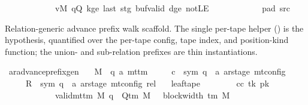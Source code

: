 \begin{isabellebody}
\ \ \ \ \ \ \ \ \ \ \ \ vM\ qQ\ kge{}\ last\ stg\ buf{\isacharunderscore}{\kern0pt}valid\ dge{}\ notLE\isanewline
\ \ \ \ \ \ \ \ \ \ \ \ pad{}\ src{}{\isacharbrackright}{\kern0pt}{\isacharparenright}{\kern0pt}%
\endisatagproof
{\isafoldproof}%
%
\isadelimproof
%
\endisadelimproof
%
\begin{isamarkuptext}%
Relation-generic advance prefix walk scaffold.  The single
  per-tape helper () is the 
  hypothesis, quantified over the per-tape config, tape index, and
  position-kind function; the union- and sub-relation prefixes are
  thin instantiations.%
\end{isamarkuptext}\isamarkuptrue%
\isamarkupfalse%
\ ar{\isacharunderscore}{\kern0pt}advance{\isacharunderscore}{\kern0pt}prefix{\isacharunderscore}{\kern0pt}gen{\isacharcolon}{\kern0pt}\isanewline
\ \ \ M\ {\isacharcolon}{\kern0pt}{\isacharcolon}{\kern0pt}\ {\isachardoublequoteopen}{\isacharparenleft}{\kern0pt}{\isacharprime}{\kern0pt}q{\isacharcomma}{\kern0pt}\ {\isacharprime}{\kern0pt}a{\isacharparenright}{\kern0pt}\ mttm{\isachardoublequoteclose}\isanewline
\ \ \ \ \ c{}\ {\isacharcolon}{\kern0pt}{\isacharcolon}{\kern0pt}\ {\isachardoublequoteopen}{\isacharparenleft}{\kern0pt}sym{}{\isacharcomma}{\kern0pt}\ {\isacharprime}{\kern0pt}q\ {\isasymtimes}\ {\isacharprime}{\kern0pt}a\ ar{\isacharunderscore}{\kern0pt}stage{\isacharparenright}{\kern0pt}\ mt{\isacharunderscore}{\kern0pt}config{\isachardoublequoteclose}\isanewline
\ \ \ \ \ R{\isacharprime}{\kern0pt}\ {\isacharcolon}{\kern0pt}{\isacharcolon}{\kern0pt}\ {\isachardoublequoteopen}{\isacharparenleft}{\kern0pt}sym{}{\isacharcomma}{\kern0pt}\ {\isacharprime}{\kern0pt}q\ {\isasymtimes}\ {\isacharprime}{\kern0pt}a\ ar{\isacharunderscore}{\kern0pt}stage{\isacharparenright}{\kern0pt}\ mt{\isacharunderscore}{\kern0pt}config\ rel{\isachardoublequoteclose}\isanewline
\ \ \ leaf{\isacharunderscore}{\kern0pt}tape{\isacharcolon}{\kern0pt}\isanewline
\ \ \ \ \ \ \ \ {\isachardoublequoteopen}{\isasymAnd}cc\ tk{\isacharprime}{\kern0pt}\ pk{\isacharprime}{\kern0pt}{\isachardot}{\kern0pt}\isanewline
\ \ \ \ \ \ \ \ \ \ \ {\isasymlbrakk}\ valid{\isacharunderscore}{\kern0pt}mttm\ M{\isacharsemicolon}{\kern0pt}\ q\ {\isasymin}\ Q{\isacharunderscore}{\kern0pt}tm\ M{\isacharsemicolon}{\kern0pt}\ {}\ {\isasymle}\ block{\isacharunderscore}{\kern0pt}width\ {\isacharparenleft}{\kern0pt}{\isasymGamma}{\isacharunderscore}{\kern0pt}tm\ M{\isacharparenright}{\kern0pt}{\isacharsemicolon}{\kern0pt}\isanewline

\end{isabellebody}

